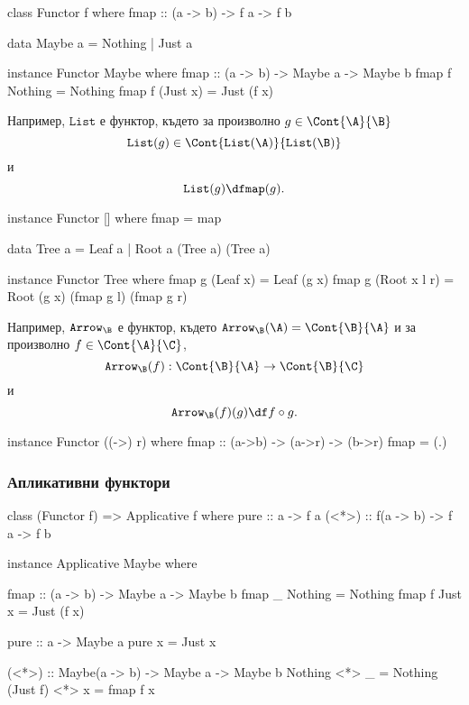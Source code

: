 \begin{haskellcode}
class Functor f where
  fmap :: (a -> b) -> f a -> f b
\end{haskellcode}

\begin{haskellcode}
data Maybe a = Nothing | Just a

instance Functor Maybe where
  fmap :: (a -> b) -> Maybe a -> Maybe b
  fmap f Nothing = Nothing
  fmap f (Just x) = Just (f x)
\end{haskellcode}


Например, $\texttt{List}$ е функтор, където за произволно $g \in \Cont{\A}{\B}$
\[\texttt{List}(g) \in \Cont{\texttt{List}(\A)}{\texttt{List}(\B)}\]
и
\[\texttt{List}(g) \df \texttt{map}(g).\]


\begin{haskellcode}
instance Functor [] where
  fmap = map
\end{haskellcode}


\begin{haskellcode}
data Tree a = Leaf a | Root a (Tree a) (Tree a)

instance Functor Tree where
  fmap g (Leaf x) = Leaf (g x)
  fmap g (Root x l r) = Root (g x) (fmap g l) (fmap g r)
\end{haskellcode}


Например, $\texttt{Arrow}_\B$ е функтор, където
$\texttt{Arrow}_\B(\A) = \Cont{\B}{\A}$ и за произволно $f \in \Cont{\A}{\C}$,
\[\texttt{Arrow}_\B(f) : \Cont{\B}{\A} \to \Cont{\B}{\C}\]
и 
\[\texttt{Arrow}_\B(f)(g) \df f \circ g.\]

\begin{haskellcode}
instance Functor ((->) r) where
  fmap :: (a->b) -> (a->r) -> (b->r)
  fmap = (.)
\end{haskellcode}



\subsubsection*{Апликативни функтори}



\begin{haskellcode}
class (Functor f) => Applicative f where
  pure :: a -> f a
  (<*>) :: f(a -> b) -> f a -> f b
\end{haskellcode}


\begin{haskellcode}
instance Applicative Maybe where

  fmap :: (a -> b) -> Maybe a -> Maybe b
  fmap _ Nothing = Nothing
  fmap f Just x = Just (f x)

  pure :: a -> Maybe a
  pure x = Just x

  (<*>) :: Maybe(a -> b) -> Maybe a -> Maybe b
  Nothing <*> _ = Nothing
  (Just f) <*> x = fmap f x
\end{haskellcode}

